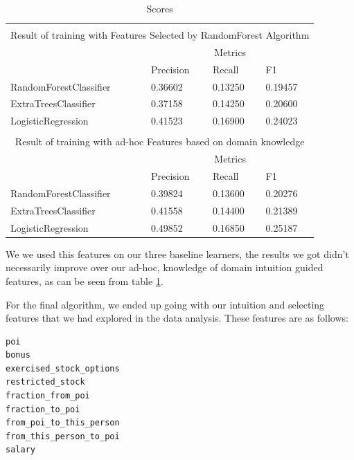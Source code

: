 \documentclass[twoside,openright,titlepage,numbers=noenddot,headinclude,%
               footinclude=true,cleardoublepage=empty,abstractoff,BCOR=5mm,%
               paper=a4,fontsize=11pt,ngerman,american]{scrreprt}
\numberwithin{theorem}{chapter}
\numberwithin{definition}{chapter}
\numberwithin{algorithm}{chapter}
\numberwithin{figure}{chapter}
\numberwithin{table}{chapter}
\numberwithin{equation}{chapter}
\begin{document}
\setlength{\extrarowheight}{1.5pt}
\begin{table}[!htbp]
\caption{Scores} %
\centering %
\begin{tabular}{|p{6cm}|p{1.5cm}|p{1.5cm}|p{1.5cm}|} %
\hline %
\multicolumn{4}{|c|}{}\\
\multicolumn{4}{|c|}{Result of training with Features Selected by RandomForest Algorithm}\\[5pt]
\hline 
& \multicolumn{3}{c|}{Metrics}\\[5pt]
\cline{2-4} 
& Precision & Recall & F1\\[0.5ex]
\hline %

RandomForestClassifier      &  0.36602&  0.13250&  0.19457\\ 
ExtraTreesClassifier        &  0.37158&  0.14250&  0.20600\\ 
LogisticRegression          &  0.41523&  0.16900&  0.24023\\ 

\hline%
\multicolumn{4}{|c|}{}\\
\multicolumn{4}{|c|}{Result of training with ad-hoc Features based on domain knowledge}\\[5pt]
\hline 
& \multicolumn{3}{c|}{Metrics}\\[5pt]
\cline{2-4} 
& Precision & Recall & F1\\[0.5ex]
\hline %

RandomForestClassifier      &  0.39824&  0.13600&  0.20276\\ 
ExtraTreesClassifier        &  0.41558&  0.14400&  0.21389\\ 
LogisticRegression          &  0.49852&  0.16850&  0.25187\\ 

\hline %

\end{tabular}
\label{benchMarkScoresTable}
\end{table}

We we used this features on our three baseline learners, the results we got didn't necessarily improve over our ad-hoc, knowledge of domain intuition guided features, as can be seen from table \ref{benchMarkScoresTable}.

For the final algorithm, we ended up going with our intuition and selecting features that we had explored in the data analysis. These features are as follows: 
\begin{verbatim}
poi
bonus
exercised_stock_options
restricted_stock
fraction_from_poi
fraction_to_poi
from_poi_to_this_person
from_this_person_to_poi
salary
\end{verbatim}
\end{document}

